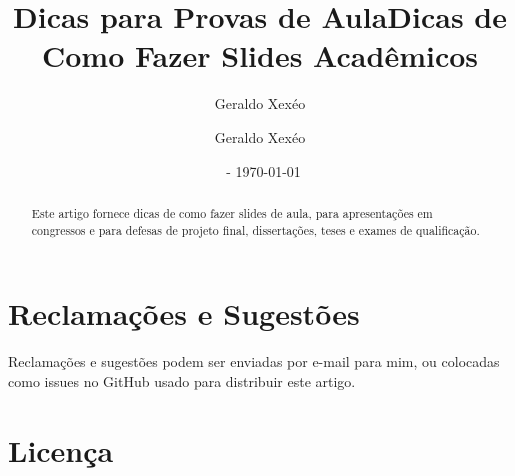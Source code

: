 \documentclass[12pt,a4paper]{article}
\title{Dicas para Provas de Aula}
\author{Geraldo Xexéo}
\affil{\url{xexeo@ufrj.br} \\
    \url{http://xexeo.net}}
\date{\ccbyncsa\  - \today}
\author{Geraldo Xexéo}
\title{Dicas de Como Fazer Slides Acadêmicos}
\begin{document}
\maketitle

\begin{abstract}
    Este artigo fornece dicas de como fazer slides de aula, para apresentações em congressos e para defesas de projeto final, dissertações, teses e exames de qualificação.
\end{abstract}

\tableofcontents















\printbibliography


\section*{Reclamações e Sugestões}

Reclamações e sugestões podem ser enviadas por e-mail para mim, ou colocadas como issues no GitHub usado para distribuir este artigo.

\section*{Licença}


\end{document}
